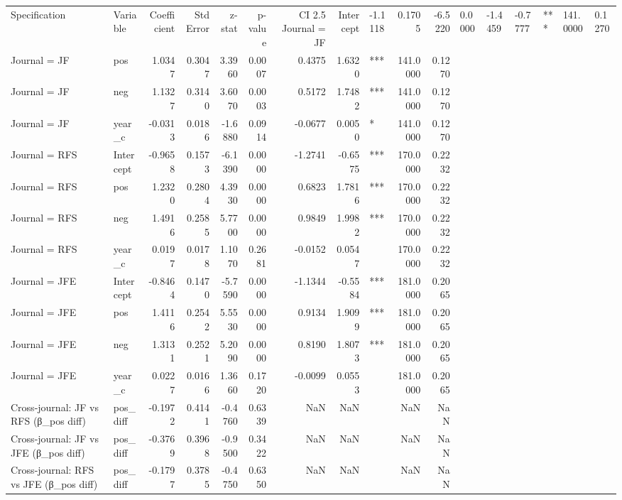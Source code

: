 \begin{tabular}{llrrrrrrlrr}
\toprule
Specification & Variable & Coefficient & Std Error & z-stat & p-value & CI 2.5%
\midrule
Journal = JF & Intercept & -1.1118 & 0.1705 & -6.5220 & 0.0000 & -1.4459 & -0.7777 & *** & 141.0000 & 0.1270 \\
Journal = JF & pos & 1.0347 & 0.3047 & 3.3960 & 0.0007 & 0.4375 & 1.6320 & *** & 141.0000 & 0.1270 \\
Journal = JF & neg & 1.1327 & 0.3140 & 3.6070 & 0.0003 & 0.5172 & 1.7482 & *** & 141.0000 & 0.1270 \\
Journal = JF & year_c & -0.0313 & 0.0186 & -1.6880 & 0.0914 & -0.0677 & 0.0050 & * & 141.0000 & 0.1270 \\
Journal = RFS & Intercept & -0.9658 & 0.1573 & -6.1390 & 0.0000 & -1.2741 & -0.6575 & *** & 170.0000 & 0.2232 \\
Journal = RFS & pos & 1.2320 & 0.2804 & 4.3930 & 0.0000 & 0.6823 & 1.7816 & *** & 170.0000 & 0.2232 \\
Journal = RFS & neg & 1.4916 & 0.2585 & 5.7700 & 0.0000 & 0.9849 & 1.9982 & *** & 170.0000 & 0.2232 \\
Journal = RFS & year_c & 0.0197 & 0.0178 & 1.1070 & 0.2681 & -0.0152 & 0.0547 &  & 170.0000 & 0.2232 \\
Journal = JFE & Intercept & -0.8464 & 0.1470 & -5.7590 & 0.0000 & -1.1344 & -0.5584 & *** & 181.0000 & 0.2065 \\
Journal = JFE & pos & 1.4116 & 0.2542 & 5.5530 & 0.0000 & 0.9134 & 1.9099 & *** & 181.0000 & 0.2065 \\
Journal = JFE & neg & 1.3131 & 0.2521 & 5.2090 & 0.0000 & 0.8190 & 1.8073 & *** & 181.0000 & 0.2065 \\
Journal = JFE & year_c & 0.0227 & 0.0166 & 1.3660 & 0.1720 & -0.0099 & 0.0553 &  & 181.0000 & 0.2065 \\
Cross-journal: JF vs RFS (β_pos diff) & pos_diff & -0.1972 & 0.4141 & -0.4760 & 0.6339 & NaN & NaN &  & NaN & NaN \\
Cross-journal: JF vs JFE (β_pos diff) & pos_diff & -0.3769 & 0.3968 & -0.9500 & 0.3422 & NaN & NaN &  & NaN & NaN \\
Cross-journal: RFS vs JFE (β_pos diff) & pos_diff & -0.1797 & 0.3785 & -0.4750 & 0.6350 & NaN & NaN &  & NaN & NaN \\
\bottomrule
\end{tabular}
